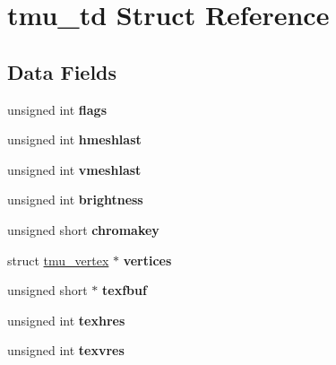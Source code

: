 \hypertarget{structtmu__td}{}\section{tmu\+\_\+td Struct Reference}
\label{structtmu__td}
\subsection*{Data Fields}
\begin{DoxyCompactItemize}
\item 
\mbox{\label{structtmu__td_ad69b6b12444097f08a761a54c0e815be}} 
unsigned int {\bfseries flags}
\item 
\mbox{\label{structtmu__td_ad4ded5965c6c1cc5634645be246f9e53}} 
unsigned int {\bfseries hmeshlast}
\item 
\mbox{\label{structtmu__td_a3111a24e3d5cc3cc396ce73d44af9a85}} 
unsigned int {\bfseries vmeshlast}
\item 
\mbox{\label{structtmu__td_a427c5d46a779f77005462c4f2acc2aa2}} 
unsigned int {\bfseries brightness}
\item 
\mbox{\label{structtmu__td_a2e087335745b9e3e62a6d999b78dd65e}} 
unsigned short {\bfseries chromakey}
\item 
\mbox{\label{structtmu__td_abcedd66ccca91f186db6c0526d30ab04}} 
struct \mbox{\hyperlink{structtmu__vertex}{tmu\+\_\+vertex}} $\ast$ {\bfseries vertices}
\item 
\mbox{\label{structtmu__td_ab60069c6945c7aa8f26100f2dbd4497a}} 
unsigned short $\ast$ {\bfseries texfbuf}
\item 
\mbox{\label{structtmu__td_a8cacd92beedb16570de7183dfff6328b}} 
unsigned int {\bfseries texhres}
\item 
\mbox{\label{structtmu__td_a3f6ef2ab3e9ccc99d3649563d966d462}} 
unsigned int {\bfseries texvres}
\item 
\mbox{\label{structtmu__td_abdf2559793679faed4036bc940af8a40}} 

\end{DoxyCompactItemize}
